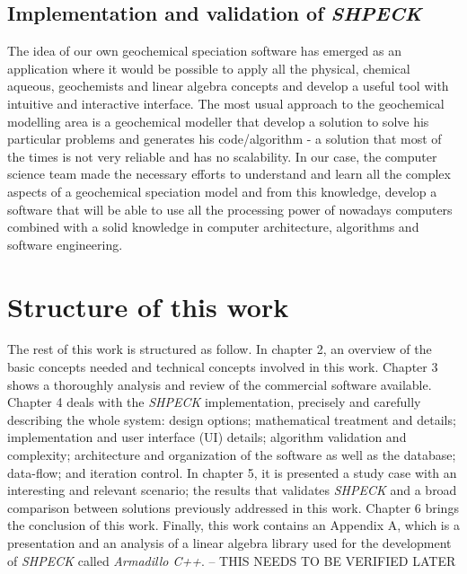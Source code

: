 \documentclass[ppgc,mestrado,english]{iiufrgs}
\begin{document}
\subsection{Implementation and validation of \emph{SHPECK}}
The idea of our own geochemical speciation software has emerged as an application where it would be possible to apply all the physical, chemical aqueous, geochemists and linear algebra concepts and develop a useful tool with intuitive and interactive interface. The most usual approach to the geochemical modelling area is a geochemical modeller that develop a solution to solve his particular problems and generates his code/algorithm - a solution that most of the times is not very reliable and has no scalability. In our case, the computer science team made the necessary efforts to understand and learn all the complex aspects of a geochemical speciation model and from this knowledge, develop a software that will be able to use all the processing power of nowadays computers combined with a solid knowledge in computer architecture, algorithms and software engineering. 

\section{Structure of this work} 
The rest of this work is structured as follow. In chapter 2, an overview of the basic concepts needed and technical concepts involved in this work. Chapter 3 shows a thoroughly analysis and review of the commercial software available. Chapter 4 deals with the \emph{SHPECK} implementation, precisely and carefully describing the whole system: design options; mathematical treatment and details; implementation and user interface (UI) details; algorithm validation and complexity; architecture and organization of the software as well as the database; data-flow; and iteration control. In chapter 5, it is presented a study case with an interesting and relevant scenario; the results that validates \emph{SHPECK} and a broad comparison between solutions previously addressed in this work. Chapter 6 brings the conclusion of this work. Finally, this work contains an Appendix A, which is a presentation and an analysis of a linear algebra library used for the development of \emph{SHPECK} called \emph{Armadillo C++}. -- THIS NEEDS TO BE VERIFIED LATER

\newpage

\end{document}
